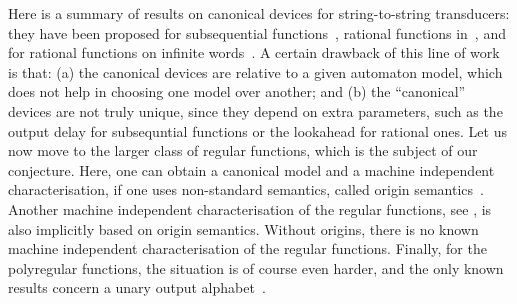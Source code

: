 Here is a summary of results on canonical devices for string-to-string transducers: they have been proposed for subsequential functions~\cite[Th\`eor\'eme 1.1]{choffrut1977}, rational functions in~\cite[Theorem 1]{reutenauerSchutzenberger1991},  and for rational functions on infinite words~\cite[Section 4]{canonicalRational2018}. A certain drawback of this line of work is that: (a) the canonical devices are relative to a given automaton model, which does not help in choosing one model over another; and (b) the ``canonical'' devices are not truly unique, since they depend on extra parameters, such as the output delay for subsequntial functions or the lookahead for rational ones. Let us now move to the larger class of regular functions, which is the subject of our conjecture. Here, one can obtain a canonical model and a machine independent characterisation, if one uses non-standard semantics, called origin semantics~\cite[Theorem 1]{bojanczykTransducersOriginInformation2014}. Another machine independent characterisation of the regular functions, see \cite[Theorem 3.2]{bojanczykTitoRegular23}, is also implicitly based on origin semantics. Without origins, there is no known machine independent characterisation of the regular functions. Finally, for the polyregular functions, the situation is of course even harder, and the only known results concern a unary output alphabet~\cite[Section IV]{Zpolyreg23}.


